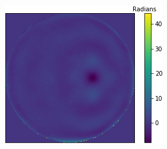 \begin{figure}[h]
\begin{subfigure}{0.285\textwidth}
		\caption{}
		\label{fig:simulated_wavefront}
	\end{subfigure}
	\begin{subfigure}{0.345\textwidth}
		\vspace{-0.2cm}
		\centering
		\includegraphics[width=1\linewidth, scale=0.5]{images/observed_simulated_wavefront_diff.png}
		\caption{}
		\label{fig:observed_simulated_wavefront_diff}
	\end{subfigure}
	

\end{figure}

